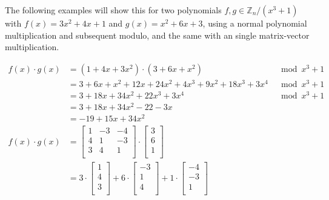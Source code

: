 The following examples will show this for two polynomials $f, g \in \mathbb{Z}_n/(x^3+1)$ with $f(x) = 3x^2+4x+1$ and $g(x) = x^2+6x+3$, using a normal polynomial multiplication and subsequent modulo, and the same with an single matrix-vector multiplication.

\begin{align*}
  f(x)\cdot g(x) & = (1+4x+3x^2) \cdot (3+6x+x^2)                & \mod x^3+1 \\
                 & = 3+6x+x^2 + 12x+24x^2+4x^3 + 9x^2+18x^3+3x^4 & \mod x^3+1 \\
                 & = 3+18x+34x^2+22x^3+3x^4                      & \mod x^3+1 \\
                 & = 3+18x+34x^2-22-3x                           &            \\
                 & = -19+15x+34x^2                               &            \\
  f(x)\cdot g(x) & = {
  \begin{bmatrix}
    1 & -3 & -4 \\
    4 & 1  & -3 \\
    3 & 4  & 1  \\
  \end{bmatrix}
  \cdot 
  \begin{bmatrix}
    3 \\
    6 \\
    1 \\
  \end{bmatrix} }                                                             \\
                 & = {
  3 \cdot \begin{bmatrix}
            1 \\
            4 \\
            3 \\
          \end{bmatrix}
  + 6 \cdot   \begin{bmatrix}
                -3 \\
                1  \\
                4  \\
              \end{bmatrix}
  + 1 \cdot   \begin{bmatrix}
                -4 \\
                -3 \\
                1  \\
              \end{bmatrix}
}
\end{align*}
